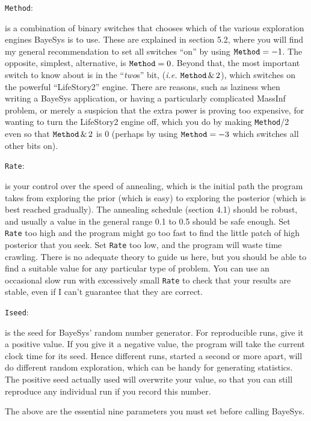 \bigskip
{\tt Method}:

 is a combination of binary switches that chooses which of the various exploration engines BayeSys is to use.  
These are explained in section 5.2, where you will find my general recommendation to set all switches ``on'' by using ${\tt Method} = -1$.  
The opposite, simplest, alternative, is ${\tt Method} = 0$.  Beyond that, the most important switch to know about is in the ``{\it two}s'' bit, 
({\it i.e.} ${\tt Method}\,\&\,2$), which switches on the powerful ``LifeStory2'' engine.  
There are reasons, such as laziness when writing a BayeSys application, or having a particularly complicated MassInf problem, 
or merely a suspicion that the extra power is proving too expensive, for wanting to turn the LifeStory2 engine off, 
which you do by making {\tt Method}/2 even so that ${\tt Method}\,\&\,2$ is 0 (perhaps by using ${\tt Method} = -3$ which switches all other bits on).


\bigskip
{\tt Rate}:

 is your control over the speed of annealing, 
which is the initial path the program takes from exploring the prior (which is easy) to exploring the posterior (which is best reached gradually).  
The annealing schedule (section 4.1) should be robust, and usually a value in the general range 0.1 to 0.5 should be safe enough.  
Set {\tt Rate} too high and the program might go too fast to find the little patch of high posterior that you seek.  
Set {\tt Rate} too low, and the program will waste time crawling.  
There is no adequate theory to guide us here, but you should be able to find a suitable value for any particular type of problem.  
You can use an occasional slow run with excessively small {\tt Rate} to check that your results are stable, even if I can't guarantee that they are correct.


\bigskip
{\tt Iseed}:

 is the seed for BayeSys' random number generator. For reproducible runs, give it a positive value.  
If you give it a negative value, the program will take the current clock time for its seed.  
Hence different runs, started a second or more apart, will do different random exploration, which can be handy for generating statistics.  
The positive seed actually used will overwrite your value, so that you can still reproduce any individual run if you record this number.
\bigskip

The above are the essential nine parameters you must set before calling BayeSys.

